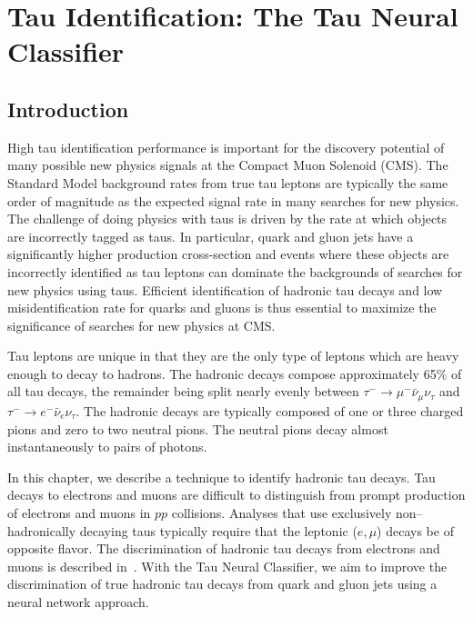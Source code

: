 \ifx\master\undefined\fi

\chapter{Tau Identification: The Tau Neural Classifier}
\label{ch:tanc}

\section{Introduction}

High tau identification performance is important for the discovery potential of
many possible new physics signals at the Compact Muon Solenoid (CMS).  The
Standard Model background rates from true tau leptons are typically the same
order of magnitude as the expected signal rate in many searches for new
physics.  The challenge of doing physics with taus is driven by the rate at
which objects are incorrectly tagged as taus.  In particular, quark and gluon
jets have a significantly higher production cross-section and events where
these objects are incorrectly identified as tau leptons can dominate the
backgrounds of searches for new physics using taus.  Efficient identification
of hadronic tau decays and low misidentification rate for quarks and gluons
is thus essential to maximize the significance of searches for new physics at
CMS.

Tau leptons are unique in that they are the only type of leptons which are heavy
enough to decay to hadrons.  The hadronic decays compose approximately 65\% of
all tau decays, the remainder being split nearly evenly between $\tau^{-} \to
\mu^{-} \bar \nu_\mu \nu_\tau$ and $\tau^{-} \to e^{-} \bar \nu_e \nu_\tau$.
The hadronic decays are typically composed of one or three charged pions and
zero to two neutral pions.  The neutral pions decay almost instantaneously to
pairs of photons.

In this chapter, we describe a technique to identify hadronic tau decays.  Tau
decays to electrons and muons are difficult to distinguish from prompt
production of electrons and
muons in $pp$ collisions.  Analyses that use exclusively
non--hadronically decaying taus typically require that the leptonic ($e,\mu$)
decays be of opposite flavor.  The discrimination of hadronic tau decays from
electrons and muons is described in~\cite{CMS-PAS-PFT-08-001}.  With the Tau Neural
Classifier, we aim to improve the discrimination of true hadronic tau decays
from quark and gluon jets using a neural network approach.

